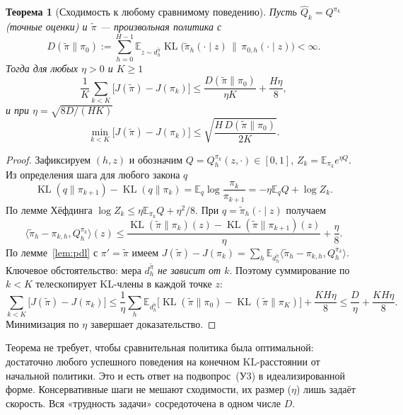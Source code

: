 \documentclass[11pt,a4paper]{article}
\theoremstyle{plain}
\newtheorem{theorem}{Теорема}[section]
\theoremstyle{definition}
\theoremstyle{remark}
\newcommand{\E}{\mathbb{E}}
\DeclareMathOperator{\KL}{KL}
\newcommand{\ip}[2]{\langle #1,#2\rangle}
\newcommand{\pit}{\tilde\pi}
\begin{document}
\begin{theorem}[Сходимость к любому сравнимому поведению]\label{thm:md}
Пусть $\hat Q_k=Q^{\pi_k}$ (точные оценки) и $\pit$ --- произвольная политика с
\[
D(\pit\|\pi_0):=\sum_{h=0}^{H-1}\E_{z\sim d^{\pit}_h}\KL\bigl(\pit_h(\cdot\mid z)\,\|\,\pi_{0,h}(\cdot\mid z)\bigr)<\infty .
\]
Тогда для любых $\eta>0$ и $K\ge1$
\[
\frac1K\sum_{k<K}\bigl[J(\pit)-J(\pi_k)\bigr]\le\frac{D(\pit\|\pi_0)}{\eta K}+\frac{H\eta}8,
\]
и при $\eta=\sqrt{8D/(HK)}$
\[
\min_{k<K}\bigl[J(\pit)-J(\pi_k)\bigr]\le\sqrt{\frac{H\,D(\pit\|\pi_0)}{2K}} .
\]
\end{theorem}
\begin{proof}
Зафиксируем $(h,z)$ и обозначим $Q=Q^{\pi_k}_h(z,\cdot)\in[0,1]$, $Z_k=\E_{\pi_k}e^{\eta Q}$. Из определения шага для любого закона $q$
\[
\KL(q\|\pi_{k+1})-\KL(q\|\pi_k)=\E_q\log\frac{\pi_k}{\pi_{k+1}}=-\eta\E_qQ+\log Z_k .
\]
По лемме Хёфдинга $\log Z_k\le\eta\E_{\pi_k}Q+\eta^2/8$. При $q=\pit_h(\cdot\mid z)$ получаем
\[
\ip{\pit_h-\pi_{k,h}}{Q^{\pi_k}_h}(z)\le\frac{\KL(\pit\|\pi_k)(z)-\KL(\pit\|\pi_{k+1})(z)}{\eta}+\frac\eta8 .
\]
По лемме~\ref{lem:pdl} с $\pi'=\pit$ имеем $J(\pit)-J(\pi_k)=\sum_h\E_{d^{\pit}_h}\ip{\pit_h-\pi_{k,h}}{Q^{\pi_k}_h}$. Ключевое обстоятельство: мера $d^{\pit}_h$ \emph{не зависит от $k$}. Поэтому суммирование по $k<K$ телескопирует KL-члены в каждой точке $z$:
\[
\sum_{k<K}\bigl[J(\pit)-J(\pi_k)\bigr]\le\frac1\eta\sum_h\E_{d^{\pit}_h}\bigl[\KL(\pit\|\pi_0)-\KL(\pit\|\pi_K)\bigr]+\frac{KH\eta}8\le\frac{D}{\eta}+\frac{KH\eta}8 .
\]
Минимизация по $\eta$ завершает доказательство.
\end{proof}

Теорема не требует, чтобы сравнительная политика была оптимальной: достаточно любого успешного поведения на конечном KL-расстоянии от начальной политики. Это и есть ответ на подвопрос~(У3) в идеализированной форме. Консервативные шаги не мешают сходимости, их размер ($\eta$) лишь задаёт скорость. Вся «трудность задачи» сосредоточена в одном числе $D$.
\end{document}
